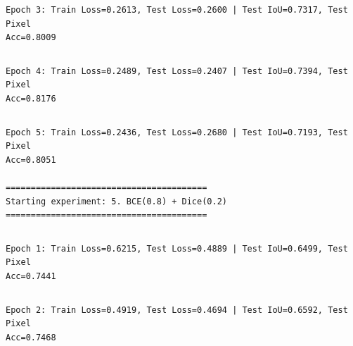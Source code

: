 \documentclass[11pt]{article}
\begin{document}
    \begin{Verbatim}[commandchars=\\\{\}]
Epoch 3: Train Loss=0.2613, Test Loss=0.2600 | Test IoU=0.7317, Test Pixel
Acc=0.8009
    \end{Verbatim}

    \begin{Verbatim}[commandchars=\\\{\}]

    \end{Verbatim}

    \begin{Verbatim}[commandchars=\\\{\}]
Epoch 4: Train Loss=0.2489, Test Loss=0.2407 | Test IoU=0.7394, Test Pixel
Acc=0.8176
    \end{Verbatim}

    \begin{Verbatim}[commandchars=\\\{\}]

    \end{Verbatim}

    \begin{Verbatim}[commandchars=\\\{\}]
Epoch 5: Train Loss=0.2436, Test Loss=0.2680 | Test IoU=0.7193, Test Pixel
Acc=0.8051

========================================
Starting experiment: 5. BCE(0.8) + Dice(0.2)
========================================
    \end{Verbatim}

    \begin{Verbatim}[commandchars=\\\{\}]

    \end{Verbatim}

    \begin{Verbatim}[commandchars=\\\{\}]
Epoch 1: Train Loss=0.6215, Test Loss=0.4889 | Test IoU=0.6499, Test Pixel
Acc=0.7441
    \end{Verbatim}

    \begin{Verbatim}[commandchars=\\\{\}]

    \end{Verbatim}

    \begin{Verbatim}[commandchars=\\\{\}]
Epoch 2: Train Loss=0.4919, Test Loss=0.4694 | Test IoU=0.6592, Test Pixel
Acc=0.7468
    \end{Verbatim}
\end{document}
